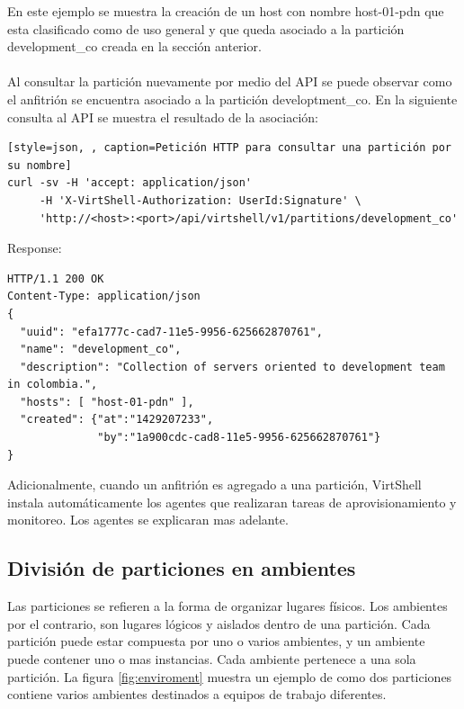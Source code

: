 En este ejemplo se muestra la creación de un host con nombre host-01-pdn que esta clasificado como de uso general y que queda asociado a la partición development\_co creada en la sección anterior.\\
\\
Al consultar la partición nuevamente por medio del API se puede observar como el anfitrión se encuentra asociado a la partición developtment\_co. En la siguiente consulta al API se muestra el resultado de la asociación: 

\begin{lstlisting}[style=json, , caption=Petición HTTP para consultar una partición por su nombre]
curl -sv -H 'accept: application/json' 
     -H 'X-VirtShell-Authorization: UserId:Signature' \ 
     'http://<host>:<port>/api/virtshell/v1/partitions/development_co'
\end{lstlisting}

Response:

\begin{lstlisting}[style=json]
HTTP/1.1 200 OK
Content-Type: application/json
{
  "uuid": "efa1777c-cad7-11e5-9956-625662870761",
  "name": "development_co",
  "description": "Collection of servers oriented to development team in colombia.", 
  "hosts": [ "host-01-pdn" ],  
  "created": {"at":"1429207233", 
              "by":"1a900cdc-cad8-11e5-9956-625662870761"}
}
\end{lstlisting}

Adicionalmente, cuando un anfitrión es agregado a una partición, VirtShell instala automáticamente los agentes  que realizaran tareas de aprovisionamiento y monitoreo. Los agentes se explicaran mas adelante.

\subsection{División de particiones en ambientes}
Las particiones se refieren a la forma de organizar lugares físicos. Los ambientes por el contrario, son lugares lógicos y aislados dentro de una partición. Cada partición puede estar compuesta por uno o varios ambientes, y un ambiente puede contener uno o mas instancias. Cada ambiente pertenece a una sola partición. La figura \ref{fig:enviroment} muestra un ejemplo de como dos particiones contiene varios ambientes destinados a equipos de trabajo diferentes. \\

